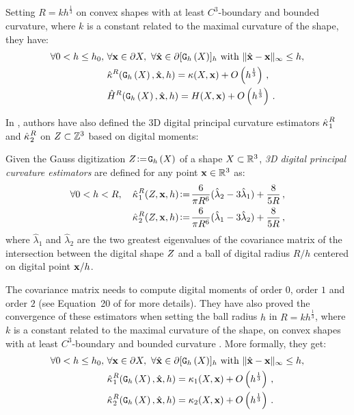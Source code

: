 \documentclass{llncs}
\begin{document}
%
Setting $R = kh^\frac{1}{3}$ on convex shapes
with at least $C^3$-boundary and bounded curvature, where $k$ is a constant
related to the maximal curvature of the shape, they have:
%
\begin{align}
\forall 0 < h \le h_0,\,\, &\forall \mathbf{x} \in \partial X,\,\,
\forall \hat{\mathbf{x}} \in \partial \lbrack \mathtt{G}_{h}\left(X\right) \rbrack_{h} \text{~with~} \| \hat{\mathbf{x}} -\mathbf{x}\|_\infty \le h, \nonumber \\
&\hat{\kappa}^{R}(\mathtt{G}_{h}\left(X\right), \hat{\mathbf{x}}, h) = \kappa(X, \mathbf{x}) + O\left(h^{\frac{1}{3}}\right)\,,\\
&\hat{H}^{R}(\mathtt{G}_{h}\left(X\right), \hat{\mathbf{x}}, h) = H(X, \mathbf{x}) + O\left(h^{\frac{1}{3}}\right)\,.
\end{align}

In \cite{CVIU2014}, authors have also defined the 3D digital principal curvature
estimators $\hat{\kappa_{}}_{1}^{R}$ and $\hat{\kappa_{}}_{2}^{R}$ on $Z\subset{\mathbb{Z}}^3$ based
on digital moments:
%
\begin{Definition}
  Given the Gauss digitization $Z \!\mathrel{\mathop:}=\! \mathtt{G}_{h}\left(X\right)$ of a shape $X \subset {\mathbb{R}}^3$,
  {\em 3D digital principal curvature estimators} are defined for any point $\mathbf{x}
  \in {\mathbb{R}}^3$ as:
  \begin{align}
    \forall 0 < h < R,\quad
    \hat{\kappa_{}}_{1}^{R}(Z,\mathbf{x},h) &\!\mathrel{\mathop:}=\! \frac{6}{\pi {R}^6}(\hat{\lambda}_2 - 3\hat{\lambda}_1) + \frac{8}{5 R} \,,\label{eq:dig-curvature-estimator-k1}\\
    \hat{\kappa_{}}_{2}^{R}(Z,\mathbf{x},h) &\!\mathrel{\mathop:}=\! \frac{6}{\pi {R}^6}(\hat{\lambda}_1 - 3\hat{\lambda}_2) + \frac{8}{5 R} \,,
    \label{eq:dig-curvature-estimator-k2}
  \end{align}
  where $\hat{\lambda}_1$ and $\hat{\lambda}_2$ are the two greatest eigenvalues
  of the covariance matrix of the intersection between the digital shape
  $Z$ and a ball of digital radius $R/h$ centered on digital point
  $\mathbf{x}/h$.
\end{Definition}
%
The covariance matrix needs to compute digital moments of order $0$, order $1$
and order $2$ (see Equation~20 of \cite{CVIU2014} for more details).
They have also proved the convergence of these estimators when setting the ball
radius $h$ in $R = kh^\frac{1}{3}$, where $k$ is a constant related to the
maximal curvature of the shape, on convex shapes with at least $C^3$-boundary
and bounded curvature \cite{CVIU2014}. More formally, they get:
%
\begin{align}
  \forall 0 < h \le h_0,\,\, &\forall \mathbf{x} \in \partial X,\,\,
  \forall \hat{\mathbf{x}} \in \partial \lbrack \mathtt{G}_{h}\left(X\right) \rbrack_{h} \text{~with~} \| \hat{\mathbf{x}} -\mathbf{x}\|_\infty \le h, \nonumber \\
  &\hat{\kappa_{}}_{1}^{R}(\mathtt{G}_{h}\left(X\right),\hat{\mathbf{x}}, h) = \kappa_{1}(X,\mathbf{x}) + O\left(h^{\frac{1}{3}}\right) \,,\\
  &\hat{\kappa_{}}_{2}^{R}(\mathtt{G}_{h}\left(X\right),\hat{\mathbf{x}}, h) = \kappa_{2}(X,\mathbf{x}) + O\left(h^{\frac{1}{3}}\right) \,.
\end{align}
\end{document}

